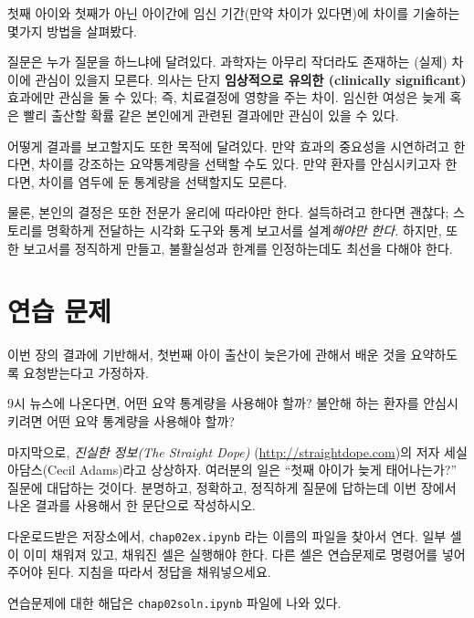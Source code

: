 첫째 아이와 첫째가 아닌 아이간에 임신 기간(만약 차이가 있다면)에 
차이를 기술하는 몇가지 방법을 살펴봤다.

질문은 누가 질문을 하느냐에 달려있다. 과학자는 아무리 작더라도 존재하는 (실제) 차이에 관심이 있을지 모른다. 의사는 단지 {\bf 임상적으로 유의한 (clinically significant)} 효과에만 관심을 둘 수 있다; 즉, 치료결정에 영향을 주는 차이. 임신한 여성은 늦게 혹은 빨리 출산할 확률 같은 본인에게 관련된 결과에만 관심이 있을 수 있다. 


어떻게 결과를 보고할지도 또한 목적에 달려있다. 만약 효과의 중요성을 시연하려고 한다면,
차이를 강조하는 요약통계량을 선택할 수도 있다. 만약 환자를 안심시키고자 한다면, 차이를 염두에 둔 통계량을 선택할지도 모른다. 

물론, 본인의 결정은 또한 전문가 윤리에 따라야만 한다. 설득하려고 한다면 괜찮다; 
스토리를 명확하게 전달하는 시각화 도구와 통계 보고서를 설계{\em 해야만 한다.}
하지만, 또한 보고서를 정직하게 만들고, 불활실성과 한계를 인정하는데도 최선을 다해야 한다.



\section{연습 문제}

\begin{exercise}
이번 장의 결과에 기반해서, 첫번째 아이 출산이 늦은가에 관해서 배운 것을 요약하도록 요청받는다고 가정하자.

9시 뉴스에 나온다면, 어떤 요약 통계량을 사용해야 할까?
불안해 하는 환자를 안심시키려면 어떤 요약 통계량을 사용해야 할까?


마지막으로, {\it 진실한 정보(The Straight Dope)} (\url{http://straightdope.com})의 저자
세실 아담스(Cecil Adams)라고 상상하자. 여러분의 일은 ``첫째 아이가 늦게 태어나는가?'' 질문에 대답하는 것이다.
분명하고, 정확하고, 정직하게 질문에 답하는데 이번 장에서 나온 결과를 사용해서 한 문단으로 작성하시오.

\end{exercise}

\begin{exercise}
다운로드받은 저장소에서, \verb"chap02ex.ipynb" 라는 이름의 파일을 찾아서 연다.
일부 셀이 이미 채워져 있고, 채워진 셀은 실행해야 한다.
다른 셀은 연습문제로 명령어를 넣어 주어야 된다.
지침을 따라서 정답을 채워넣으세요.

연습문제에 대한 해답은 \verb"chap02soln.ipynb" 파일에 나와 있다.

\end{exercise}

